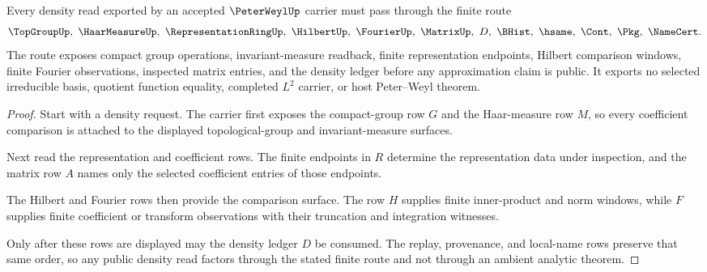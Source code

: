 \begin{theorem}
\label{thm:peter-weyl-matrix-coefficient-density}
Every density read exported by an accepted $\PeterWeylUp$ carrier must pass through the finite route
$$
\TopGroupUp,\ \HaarMeasureUp,\ \RepresentationRingUp,\ \HilbertUp,\ \FourierUp,\ \MatrixUp,\ D,\ \BHist,\ \hsame,\ \Cont,\ \Pkg,\ \NameCert .
$$
The route exposes compact group operations, invariant-measure readback, finite representation endpoints, Hilbert comparison windows, finite Fourier observations, inspected matrix entries, and the density ledger before any approximation claim is public. It exports no selected irreducible basis, quotient function equality, completed $L^2$ carrier, or host Peter--Weyl theorem.
\end{theorem}
\begin{proof}
Start with a density request. The carrier first exposes the compact-group row $G$ and the Haar-measure row $M$, so every coefficient comparison is attached to the displayed topological-group and invariant-measure surfaces.

Next read the representation and coefficient rows. The finite endpoints in $R$ determine the representation data under inspection, and the matrix row $A$ names only the selected coefficient entries of those endpoints.

The Hilbert and Fourier rows then provide the comparison surface. The row $H$ supplies finite inner-product and norm windows, while $F$ supplies finite coefficient or transform observations with their truncation and integration witnesses.

Only after these rows are displayed may the density ledger $D$ be consumed. The replay, provenance, and local-name rows preserve that same order, so any public density read factors through the stated finite route and not through an ambient analytic theorem.
\end{proof}

